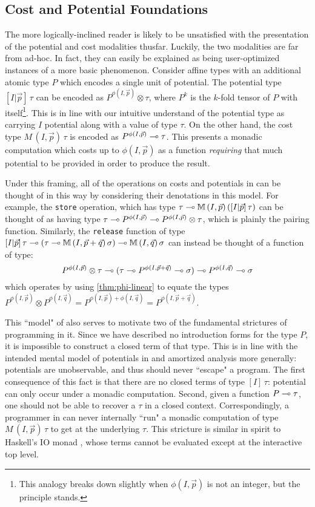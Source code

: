 \subsection{Cost and Potential Foundations}
The more logically-inclined reader is likely to be unsatisfied with the presentation of the potential and cost modalities thusfar. Luckily, the two modalities are far from ad-hoc. In fact, they can easily be explained as being user-optimized instances of a more basic phenomenon. Consider affine types with an additional atomic type $P$ which encodes a single unit of potential. The potential type $[I|\vec{p}] \, \tau$ can be encoded as $P^{\phi(I,\vec{p})} \otimes \tau$, where $P^k$ is the $k$-fold tensor of $P$ with itself\footnote{
This analogy breaks down slightly when $\phi(I,\vec{p})$ is not an integer, but the principle stands.
}. This is in line with our intuitive understand of the potential type as carrying $I$ potential along with a value of type $\tau$. On the other hand, the cost type $M \,(I,\vec{p}) \, \tau$ is encoded as $P^{\phi(I,\vec{p})} \multimap \tau$. This presents a monadic computation which costs up to $\phi(I,\vec{p})$ as a function \textit{requiring} that much potential to be provided in order to produce the result.

Under this framing, all of the operations on costs and potentials in \dlambdaamor can be thought of in this way by considering their denotations in this model. For example, the \texttt{store} operation, which has type $\tau \multimap \mathbb{M} \, (I,\vec{p}) \, ([I|\vec{p}] \, \tau)$ can be thought of as having type $\tau \multimap P^{\phi(I,\vec{p})} \multimap P^{\phi(I,\vec{p})} \otimes \tau$, which is plainly the pairing function. Similarly, the \texttt{release} function of type $[I|\vec{p}] \, \tau \multimap (\tau \multimap \mathbb{M} \, (I,\vec{p} + \vec{q}) \, \sigma) \multimap \mathbb{M} \, (I,\vec{q})\, \sigma$ can instead be thought of a function of type:
$$
P^{\phi(I,\vec{p})} \otimes \tau \multimap (\tau \multimap P^{\phi(I,\vec{p} + \vec{q})} \multimap \sigma) \multimap P^{\phi(I,\vec{q})} \multimap \sigma
$$
which operates by using \autoref{thm:phi-linear} to equate the types $P^{\phi(I,\vec{p})} \otimes P^{\phi(I,\vec{q})} = P^{\phi(I,\vec{p}) + \phi(I,\vec{q})} = P^{\phi(I,\vec{p} + \vec{q})}$.

This ``model" of \dlambdaamor also serves to motivate two of the fundamental strictures of programming in it. Since we have described no introduction forms for the type $P$, it is impossible to construct a closed term of that type. This is in line with the intended mental model of potentials in \dlambdaamor and amortized analysis more generally: potentials are unobservable, and thus should never ``escape" a program. The first consequence of this fact is that there are no closed terms of type $[I] \, \tau$: potential can only occur under a monadic computation. Second, given a function $P \multimap \tau$, one should not be able to recover a $\tau$ in a closed context. Correspondingly, a programmer in \dlambdaamor can never internally ``run" a monadic computation of type $M \, (I,\vec{p}) \, \tau$ to get at the underlying $\tau$. This stricture is similar in spirit to Haskell's IO monad \citehere, whose terms cannot be evaluated except at the interactive top level.


